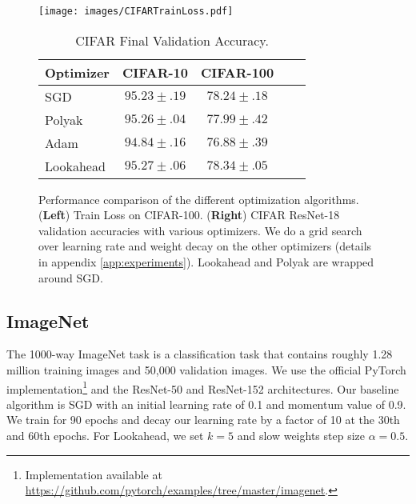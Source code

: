 \documentclass{article}
\begin{document}
\begin{figure}[t]
\centering
\begin{minipage}[t]{0.48 \linewidth}
    \centering
    \texttt{[image: images/CIFARTrainLoss.pdf]}
\end{minipage}
\hfill
\begin{minipage}[t]{0.48 \linewidth}
\begin{table}[H]
\begin{center}
\vspace{-1.4in}
\begin{sc}
\begin{tabular}{l c c c c }
\toprule
Optimizer & CIFAR-10 & CIFAR-100  \\
\midrule
SGD & $95.23 \pm .19$ & $78.24 \pm .18$ \\ 
Polyak & $95.26 \pm .04$ & $77.99 \pm .42$ \\
Adam & $94.84 \pm .16$ & $76.88 \pm .39$ \\ 
Lookahead & $95.27 \pm .06$ & $78.34 \pm .05$ \\
\bottomrule
\end{tabular}
\end{sc}
\end{center}
\caption{CIFAR Final Validation Accuracy.}
\end{table}
\end{minipage}
\caption{Performance comparison of the different optimization algorithms. ({\bf{Left}}) Train Loss on CIFAR-100. ({\bf{Right}}) CIFAR ResNet-18 validation accuracies with various optimizers. We do a grid search over learning rate and weight decay on the other optimizers (details in appendix \ref{app:experiments}). Lookahead and Polyak are wrapped around SGD.}
\label{tabel:cifar-optimizer-compare}
\end{figure}







 \subsection{ImageNet} 

The 1000-way ImageNet task \citep{deng2009imagenet} is a classification task that contains roughly 1.28 million training images and 50,000 validation images. We use the official PyTorch implementation\footnote{Implementation available at \url{https://github.com/pytorch/examples/tree/master/imagenet}.} and the ResNet-50 and ResNet-152  \citep{he2016deep} architectures. Our baseline algorithm is SGD with an initial learning rate of 0.1 and momentum value of 0.9. We train for 90 epochs and decay our learning rate by a factor of 10 at the 30th and 60th epochs. For Lookahead, we set $k=5$ and slow weights step size $\alpha = 0.5$.
\end{document}
